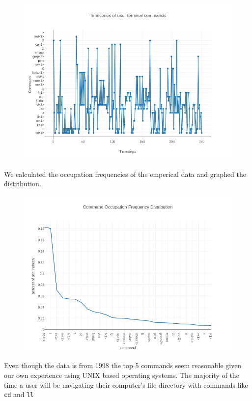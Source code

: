 \documentclass[10pt]{article}
\begin{document}
\begin{figure}[ht]
  \centering
  \includegraphics[scale=.65]{../pictures/250-emperical-timesteps.png}
\end{figure}

We calculated the occupation frequencies of the emperical data and graphed the
distribution.

\begin{figure}[ht]
  \centering
  \includegraphics[scale=.65]{../pictures/emperical-occ-freq-dist.png}
\end{figure}

Even though the data is from 1998 the top 5 commands seem reasonable given our
own experience using UNIX based operating systems. The majority of the time a
user will be navigating their computer's file directory with commands like
\texttt{cd} and \texttt{ll}
\end{document}
